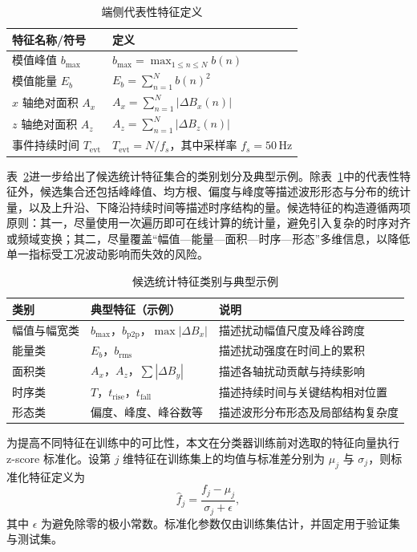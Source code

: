 \begin{table}[!htbp]
\centering
\small
\caption{端侧代表性特征定义}
\label{tab:ch3_edge_feat_defs}
\begin{tabular}{p{3.8cm} p{8.4cm}}
\hline
特征名称/符号 & 定义 \\
\hline
模值峰值 $b_{\max}$ & $b_{\max}=\max_{1\le n\le N} b(n)$ \\
模值能量 $E_b$ & $E_b=\sum_{n=1}^{N} b(n)^2$ \\
$x$ 轴绝对面积 $A_x$ & $A_x=\sum_{n=1}^{N} |\Delta B_x(n)|$ \\
$z$ 轴绝对面积 $A_z$ & $A_z=\sum_{n=1}^{N} |\Delta B_z(n)|$ \\
事件持续时间 $T_{\mathrm{evt}}$ & $T_{\mathrm{evt}}=N/f_s$，其中采样率 $f_s=50\,\mathrm{Hz}$ \\
\hline
\end{tabular}
\end{table}

表~\ref{tab:ch3_feat_pool}进一步给出了候选统计特征集合的类别划分及典型示例。除表~\ref{tab:ch3_edge_feat_defs}中的代表性特征外，候选集合还包括峰峰值、均方根、偏度与峰度等描述波形形态与分布的统计量，以及上升沿、下降沿持续时间等描述时序结构的量。候选特征的构造遵循两项原则：其一，尽量使用一次遍历即可在线计算的统计量，避免引入复杂的时序对齐或频域变换；其二，尽量覆盖“幅值—能量—面积—时序—形态”多维信息，以降低单一指标受工况波动影响而失效的风险。

\begin{table}[!htbp]
\centering
\small
\caption{候选统计特征类别与典型示例}
\label{tab:ch3_feat_pool}
\setlength{\tabcolsep}{5pt}
\renewcommand{\arraystretch}{1.15}
\begin{tabular}{p{2.6cm} p{4.8cm} p{6.0cm}}
\hline
类别 & 典型特征（示例） & 说明 \\
\hline
幅值与幅宽类 & $b_{\max}$，$b_{\mathrm{p2p}}$，$\max|\Delta B_x|$ & 描述扰动幅值尺度及峰谷跨度 \\
能量类 & $E_b$，$b_{\mathrm{rms}}$ & 描述扰动强度在时间上的累积 \\
面积类 & $A_x$，$A_z$，$\sum |\Delta B_y|$ & 描述各轴扰动贡献与持续影响 \\
时序类 & $T$，$t_{\mathrm{rise}}$，$t_{\mathrm{fall}}$ & 描述持续时间与关键结构相对位置 \\
形态类 & 偏度、峰度、峰谷数等 & 描述波形分布形态及局部结构复杂度 \\
\hline
\end{tabular}
\end{table}

为提高不同特征在训练中的可比性，本文在分类器训练前对选取的特征向量执行 z-score 标准化。设第 $j$ 维特征在训练集上的均值与标准差分别为 $\mu_j$ 与 $\sigma_j$，则标准化特征定义为
\begin{equation}
    \hat f_j = \frac{f_j-\mu_j}{\sigma_j+\epsilon},
\end{equation}
其中 $\epsilon$ 为避免除零的极小常数。标准化参数仅由训练集估计，并固定用于验证集与测试集。

